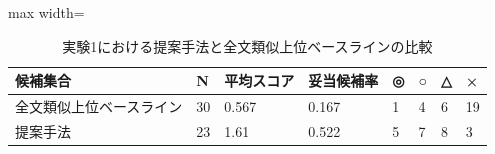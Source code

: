 \begin{table}[tbp]
\centering
\small
\caption{実験1における提案手法と全文類似上位ベースラインの比較}
\label{tab:experiment1_baseline_table}
\begin{adjustbox}{max width=\textwidth}
\begin{tabular}{llllllll}
\toprule
候補集合 & N & 平均スコア & 妥当候補率 & ◎ & ○ & △ & × \\
\midrule
全文類似上位ベースライン & 30 & 0.567 & 0.167 & 1 & 4 & 6 & 19 \\
提案手法 & 23 & 1.61 & 0.522 & 5 & 7 & 8 & 3 \\
\bottomrule
\end{tabular}
\end{adjustbox}
\end{table}
